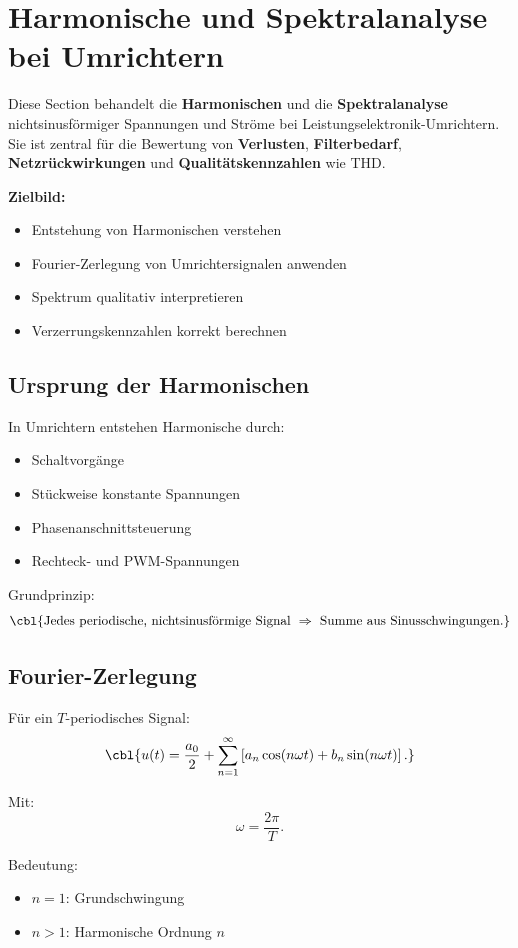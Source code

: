 \section{Harmonische und Spektralanalyse bei Umrichtern}

Diese Section behandelt die \textbf{Harmonischen} und die \textbf{Spektralanalyse}
nichtsinusförmiger Spannungen und Ströme bei Leistungselektronik-Umrichtern.
Sie ist zentral für die Bewertung von \textbf{Verlusten}, \textbf{Filterbedarf},
\textbf{Netzrückwirkungen} und \textbf{Qualitätskennzahlen} wie THD.

\smallskip

\textbf{Zielbild:}
\begin{itemize}
    \item Entstehung von Harmonischen verstehen
    \item Fourier-Zerlegung von Umrichtersignalen anwenden
    \item Spektrum qualitativ interpretieren
    \item Verzerrungskennzahlen korrekt berechnen
\end{itemize}

\subsection{Ursprung der Harmonischen}

In Umrichtern entstehen Harmonische durch:
\begin{itemize}
    \item Schaltvorgänge
    \item Stückweise konstante Spannungen
    \item Phasenanschnittsteuerung
    \item Rechteck- und PWM-Spannungen
\end{itemize}

Grundprinzip:
\[
\cbl{\text{Jedes periodische, nichtsinusförmige Signal } \Rightarrow \text{ Summe aus Sinusschwingungen}.}
\]

\subsection{Fourier-Zerlegung}

Für ein $T$-periodisches Signal:
\[
\cbl{u(t) = \frac{a_0}{2} + \sum_{n=1}^{\infty}
\left[ a_n \cos(n \omega t) + b_n \sin(n \omega t) \right].}
\]

Mit:
\[
\omega = \frac{2\pi}{T}.
\]

Bedeutung:
\begin{itemize}
    \item $n=1$: Grundschwingung
    \item $n>1$: Harmonische Ordnung $n$
\end{itemize}



